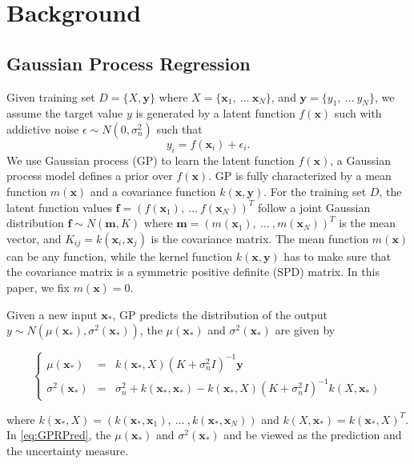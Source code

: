 \section{Background}

\subsection{Gaussian Process Regression}\label{sec:SOGP}

Given training set $D = \{X, \bm{y}\}$ where $X = \{\bm{x}_1,~\dots~\bm{x}_N\}$, and $\bm{y} = \{y_1,~\dots~y_N\}$, we assume the target value $y$ is generated
by a latent function $f(\bm{x})$ such with addictive noise $\epsilon \sim N(0, \sigma_n^2)$ such that
\begin{equation}
    \label{eq:yf}
    y_i = f(\bm{x}_i) + \epsilon_i.
\end{equation}
We use Gaussian process (GP)\cite{GPML} to learn the latent function $f(\bm{x})$, a Gaussian process model defines a prior over $f(\bm{x})$. GP is fully characterized by a mean function $m(\bm{x})$ and a covariance function $k(\bm{x}, \bm{y})$. For the training set $D$, the latent function values $\bm{f} = (f(\bm{x}_1),~\dots~f(\bm{x}_N))^T$ follow a joint Gaussian distribution $\bm{f} \sim N(\bm{m}, K)$ where $\bm{m} = (m(\bm{x}_1),~\dots~,m(\bm{x}_N))^T$ is the mean vector, and $K_{ij} = k(\bm{x}_i, \bm{x}_j)$ is the covariance matrix. The mean function $m(\bm{x})$ can be any function, while the kernel function $k(\bm{x}, \bm{y})$ has to make sure that the covariance matrix is a symmetric positive definite (SPD) matrix. In this paper, we fix $m(\bm{x}) = 0$.

Given a new input $\bm{x}_*$, GP predicts the distribution of the output $y \sim N(\mu(\bm{x}_*), \sigma^2(\bm{x}_*))$, the $\mu(\bm{x}_*)$ and $\sigma^2(\bm{x}_*)$ are given by

\begin{equation}
    \left\{
        \begin{array}{lll}
            \mu(\bm{x}_*)      &=& k(\bm{x}_*, X) (K + \sigma_n^2 I)^{-1} \bm{y} \\
            \sigma^2(\bm{x}_*) &=& \sigma_n^2 + k(\bm{x}_*, \bm{x}_*) - k(\bm{x}_*, X) (K + \sigma_n^2 I)^{-1} k(X, \bm{x}_*) 
        \end{array}
    \right.
    \label{eq:GPRPred}
\end{equation}

where $k(\bm{x}_*, X) = (k(\bm{x}_*, \bm{x}_1),~\dots~,k(\bm{x}_*, \bm{x}_N))$ and $k(X, \bm{x}_*) = k(\bm{x}_*, X)^T$. In \eqref{eq:GPRPred}, the $\mu(\bm{x}_*)$ and $\sigma^2(\bm{x}_*)$ and be viewed as the prediction and the uncertainty measure.

